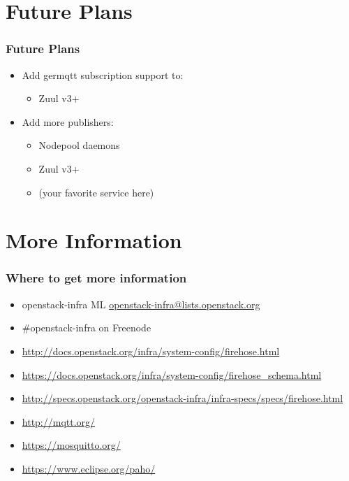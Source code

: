 \documentclass[aspectratio=169,11pt,hyperref={colorlinks=true}]{beamer}
\begin{document}
\section{Future Plans}
\begin{frame}
    \frametitle{Future Plans}
    \begin{itemize}
        \item Add germqtt subscription support to:
            \begin{itemize}
                \item Zuul v3+
            \end{itemize}
        \item Add more publishers:
            \begin{itemize}
                \item Nodepool daemons
                \item Zuul v3+
                \item (your favorite service here)
            \end{itemize}
    \end{itemize}
\end{frame}

\section{More Information}
\begin{frame}
\frametitle{Where to get more information}
    \begin{itemize}
        \item openstack-infra ML\: \href{mailto:openstack-infra@lists.openstack.org}{openstack-infra@lists.openstack.org}
        \item \#openstack-infra on Freenode
	    \item \href{http://docs.openstack.org/infra/system-config/firehose.html}{http://docs.openstack.org/infra/system-config/firehose.html}
        \item \href{https://docs.openstack.org/infra/system-config/firehose_schema.html}{https://docs.openstack.org/infra/system-config/firehose\_schema.html}
	    \item \href{http://specs.openstack.org/openstack-infra/infra-specs/specs/firehose.html}{http://specs.openstack.org/openstack-infra/infra-specs/specs/firehose.html}
	    \item \href{http://mqtt.org/}{http://mqtt.org/}
	    \item \href{https://mosquitto.org/}{https://mosquitto.org/}
        \item \href{https://www.eclipse.org/paho/}{https://www.eclipse.org/paho/}
    \end{itemize}
\end{frame}
\end{document}
